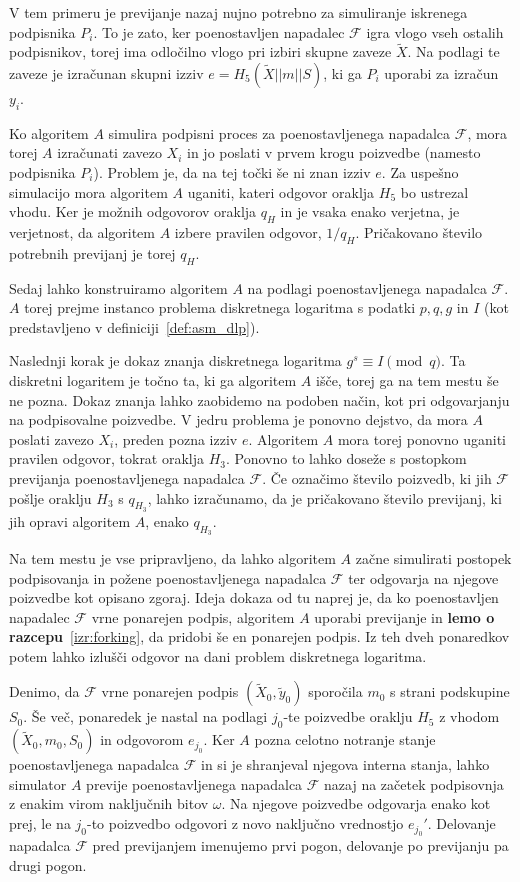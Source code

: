 \begin{dokaz}
V tem primeru je previjanje nazaj nujno potrebno za simuliranje iskrenega podpisnika $P_i$. To je zato,
ker poenostavljen napadalec $\mathcal{F}$ igra vlogo vseh ostalih podpisnikov, torej ima odločilno
vlogo pri izbiri skupne zaveze $\tilde{X}$. Na podlagi te zaveze je izračunan skupni izziv 
$e = H_5(\tilde{X} || m || S)$, ki ga $P_i$ uporabi za izračun $y_i$. 

Ko algoritem $A$ simulira podpisni proces za poenostavljenega napadalca $\mathcal{F}$, mora torej
$A$ izračunati zavezo $X_i$ in jo poslati v prvem krogu poizvedbe (namesto podpisnika $P_i$). Problem
je, da na tej točki še ni znan izziv $e$. Za uspešno simulacijo mora algoritem $A$ uganiti, kateri
odgovor oraklja $H_5$ bo ustrezal vhodu. Ker je možnih odgovorov oraklja $q_H$ in je vsaka enako
verjetna, je verjetnost, da algoritem $A$ izbere pravilen odgovor, $1/q_H$. Pričakovano število
potrebnih previjanj je torej $q_H$.

Sedaj lahko konstruiramo algoritem $A$ na podlagi poenostavljenega napadalca $\mathcal{F}$. $A$ torej
prejme instanco problema diskretnega logaritma s podatki $p, q, g$ in $I$ (kot predstavljeno v
definiciji~\ref{def:asm_dlp}).

Naslednji korak je dokaz znanja diskretnega logaritma $g^s \equiv I \pmod q$. Ta diskretni logaritem
je točno ta, ki ga algoritem $A$ išče, torej ga na tem mestu še ne pozna. Dokaz znanja lahko zaobidemo
na podoben način, kot pri odgovarjanju na podpisovalne poizvedbe. V jedru problema je ponovno dejstvo,
da mora $A$ poslati zavezo $X_i$, preden pozna izziv $e$. Algoritem $A$ mora torej ponovno uganiti
pravilen odgovor, tokrat oraklja $H_3$. Ponovno to lahko doseže s postopkom previjanja poenostavljenega
napadalca $\mathcal{F}$. Če označimo število poizvedb, ki jih $\mathcal{F}$ pošlje oraklju $H_3$ s
$q_{H_3}$, lahko izračunamo, da je pričakovano število previjanj, ki jih opravi algoritem $A$,
enako $q_{H_3}$.

Na tem mestu je vse pripravljeno, da lahko algoritem $A$ začne simulirati postopek podpisovanja in
požene poenostavljenega napadalca $\mathcal{F}$ ter odgovarja na njegove poizvedbe kot opisano zgoraj.
Ideja dokaza od tu naprej je, da ko poenostavljen napadalec $\mathcal{F}$ vrne ponarejen podpis,
algoritem $A$ uporabi previjanje in \textbf{lemo o razcepu}~\ref{izr:forking}, da pridobi še en
ponarejen podpis. Iz teh dveh ponaredkov potem lahko izlušči odgovor na dani problem diskretnega
logaritma.

Denimo, da $\mathcal{F}$ vrne ponarejen podpis $(\tilde{X}_0, \tilde{y}_0)$ sporočila $m_0$ s strani
podskupine $S_0$. Še več, ponaredek je nastal na podlagi $j_0$-te poizvedbe oraklju $H_5$ z vhodom
$(\tilde{X}_0, m_0, S_0)$ in odgovorom $e_{j_0}$. Ker $A$ pozna celotno notranje stanje poenostavljenega
napadalca $\mathcal{F}$ in si je shranjeval njegova interna stanja, lahko simulator $A$ previje
poenostavljenega napadalca $\mathcal{F}$ nazaj na začetek podpisovnja z enakim virom naključnih bitov
$\omega$. Na njegove poizvedbe odgovarja enako kot prej, le na $j_0$-to poizvedbo odgovori z novo
naključno vrednostjo $e_{j_0}'$. Delovanje napadalca $\mathcal{F}$ pred previjanjem imenujemo prvi
pogon, delovanje po previjanju pa drugi pogon.


\end{dokaz}
